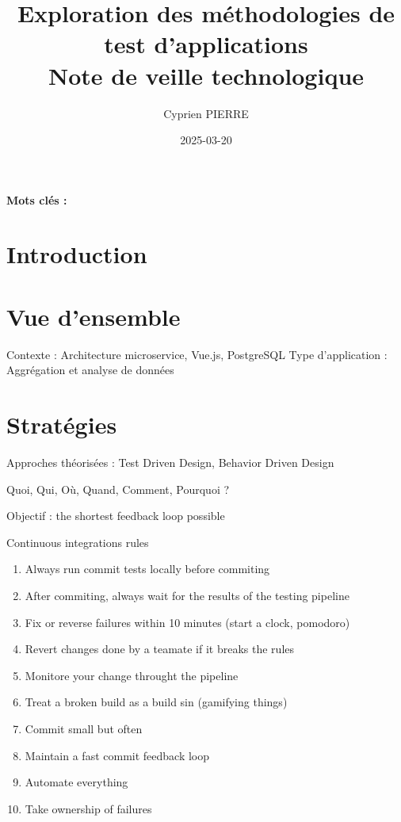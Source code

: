 \documentclass[a4paper,12pt]{article}
\author{Cyprien PIERRE \orcidlink{0009-0009-9040-6795}}
\date{2025-03-20}
\title{Exploration des méthodologies de test d'applications\\\medskip
\large Note de veille technologique}
\begin{document}
\maketitle
\begin{abstract}
\end{abstract}

\renewcommand\{\keywordsname\{\textbf{Mots clés : }

\begin{multicols}{2}

\setcounter{tocdepth}{2}
\tableofcontents
\section*{Introduction}
\label{sec:orge5c2725}

\section*{Vue d'ensemble}
\label{sec:orgfce0227}
Contexte : Architecture microservice, Vue.js, PostgreSQL
Type d'application : Aggrégation et analyse de données
\section*{Stratégies}
\label{sec:org9e94f23}
Approches théorisées : Test Driven Design, Behavior Driven Design

Quoi, Qui, Où, Quand, Comment, Pourquoi ?

Objectif : the shortest feedback loop possible

Continuous integrations rules
\begin{enumerate}
\item Always run commit tests locally before commiting
\item After commiting, always wait for the results of the testing pipeline
\item Fix or reverse failures within 10 minutes (start a clock, pomodoro)
\item Revert changes done by a teamate if it breaks the rules
\item Monitore your change throught the pipeline
\item Treat a broken build as a build sin (gamifying things)
\item Commit small but often
\item Maintain a fast commit feedback loop
\item Automate everything
\item Take ownership of failures
\end{enumerate}


\end{multicols}
\end{document}
